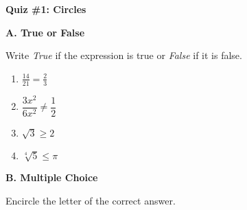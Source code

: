 \documentclass[12pt, letterpaper]{article}
\begin{document}
	\begin{center}
		\textbf{\large Quiz \#1: Circles}
	\end{center}
	
	\vspace*{5mm}
	
	\noindent \textbf{A. True or False} 
	
	Write \textit{True} if the expression is true or \textit{False} if it is false. 
	
	\begin{multicols}{2}
	\begin{enumerate}
		
			\item $ \frac{14}{21} = \frac{2}{3} $
			\item $ \dfrac{3x^2}{6x^2} \neq \dfrac{1}{2} $
			\item $ \sqrt{3 } \geq 2 $
			\item $ \sqrt[4]{5} \leq \pi $
		
	\end{enumerate}
\end{multicols}
	
	\vspace*{4mm}
	
	\noindent \textbf{B. Multiple Choice} 
	
	Encircle the letter of the correct answer.
	
\end{document}
